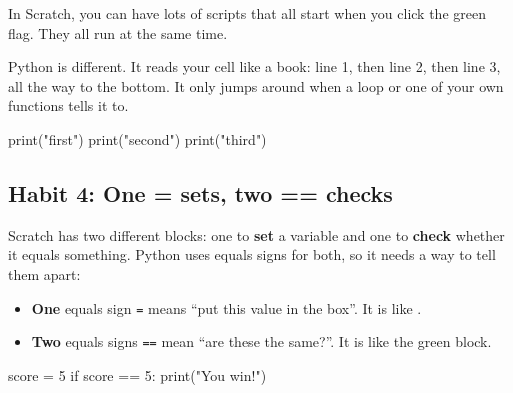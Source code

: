 In Scratch, you can have lots of scripts that all start when you click the green flag. They all run at the same time.

Python is different. It reads your cell like a book: line 1, then line 2, then line 3, all the way to the bottom. It only jumps around when a loop or one of your own functions tells it to.

\begin{tcbraster}[raster columns=2, raster equal height=rows, raster column skip=12pt, raster valign=center]
\begin{tcolorbox}[colback=white, colframe=white, boxrule=0pt, valign=center]
\begin{scratch}
\end{scratch}
\end{tcolorbox}
\begin{code}
print("first")
print("second")
print("third")
\end{code}
\end{tcbraster}

\subsection*{Habit 4: One = sets, two == checks}

Scratch has two different blocks: one to \textbf{set} a variable and one to \textbf{check} whether it equals something. Python uses equals signs for both, so it needs a way to tell them apart:

\begin{itemize}
  \item \textbf{One} equals sign \texttt{=} means ``put this value in the box''. It is like .
  \item \textbf{Two} equals signs \texttt{==} mean ``are these the same?''. It is like the green \chip[operators]{\ = \ } block.
\end{itemize}

\begin{tcbraster}[raster columns=2, raster equal height=rows, raster column skip=12pt, raster valign=center]
\begin{tcolorbox}[colback=white, colframe=white, boxrule=0pt, valign=center]
\begin{scratch}
\end{scratch}
\end{tcolorbox}
\begin{code}
score = 5
if score == 5:
    print("You win!")
\end{code}
\end{tcbraster}

